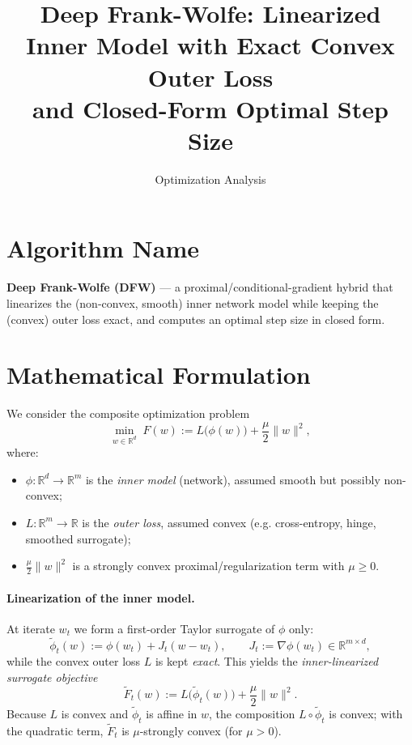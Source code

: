 \documentclass[11pt]{article}
\title{Deep Frank-Wolfe: Linearized Inner Model with Exact Convex Outer Loss\\
and Closed-Form Optimal Step Size}
\author{Optimization Analysis}
\date{}
\begin{document}
\maketitle

\section*{Algorithm Name}
\textbf{Deep Frank-Wolfe (DFW)} --- a proximal/conditional-gradient hybrid that
linearizes the (non-convex, smooth) inner network model while keeping the
(convex) outer loss exact, and computes an optimal step size in closed form.

\section*{Mathematical Formulation}

We consider the composite optimization problem
\begin{equation}
\min_{w \in \mathbb{R}^d} \; F(w) := L\big(\phi(w)\big) + \frac{\mu}{2}\|w\|^2 ,
\label{eq:problem}
\end{equation}
where:
\begin{itemize}
  \item $\phi : \mathbb{R}^d \to \mathbb{R}^m$ is the \emph{inner model}
        (network), assumed smooth but possibly non-convex;
  \item $L : \mathbb{R}^m \to \mathbb{R}$ is the \emph{outer loss},
        assumed convex (e.g. cross-entropy, hinge, smoothed surrogate);
  \item $\frac{\mu}{2}\|w\|^2$ is a strongly convex proximal/regularization term
        with $\mu \ge 0$.
\end{itemize}

\paragraph{Linearization of the inner model.}
At iterate $w_t$ we form a first-order Taylor surrogate of $\phi$ only:
\begin{equation}
\tilde{\phi}_t(w) := \phi(w_t) + J_t (w - w_t),
\qquad J_t := \nabla \phi(w_t) \in \mathbb{R}^{m \times d},
\label{eq:linearize}
\end{equation}
while the convex outer loss $L$ is kept \emph{exact}. This yields the
\emph{inner-linearized surrogate objective}
\begin{equation}
\tilde{F}_t(w) := L\big(\tilde{\phi}_t(w)\big) + \frac{\mu}{2}\|w\|^2 .
\label{eq:surrogate}
\end{equation}
Because $L$ is convex and $\tilde{\phi}_t$ is affine in $w$, the composition
$L\circ\tilde{\phi}_t$ is convex; with the quadratic term, $\tilde{F}_t$ is
$\mu$-strongly convex (for $\mu>0$).
\end{document}
